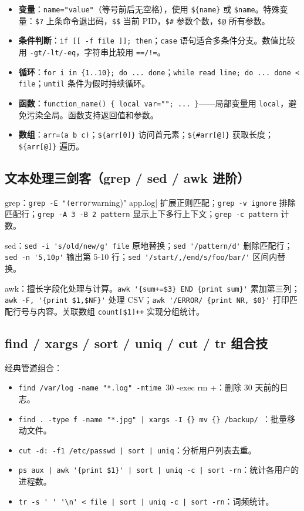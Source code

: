\documentclass[12pt,UTF8]{ctexbook}
\begin{document}
\begin{itemize}
	\item \textbf{变量}：\verb|name="value"|（等号前后无空格），使用 \verb|${name}| 或 \verb|$name|。特殊变量：\verb|$?| 上条命令退出码，\verb|$$| 当前 PID，\verb|$#| 参数个数，\verb|$@| 所有参数。
	\item \textbf{条件判断}：\verb|if [[ -f file ]]; then|；\verb|case| 语句适合多条件分支。数值比较用 \verb|-gt/-lt/-eq|，字符串比较用 \verb|==/!=|。
	\item \textbf{循环}：\verb|for i in {1..10}; do ... done|；\verb|while read line; do ... done < file|；\verb|until| 条件为假时持续循环。
	\item \textbf{函数}：\verb|function_name() { local var=""; ... }|——局部变量用 \verb|local|，避免污染全局。函数支持返回值和参数。
	\item \textbf{数组}：\verb|arr=(a b c)|；\verb|${arr[0]}| 访问首元素；\verb|${#arr[@]}| 获取长度；\verb|${arr[@]}| 遍历。
\end{itemize}

    \subsection{文本处理三剑客（grep / sed / awk 进阶）}

grep：\verb|grep -E "(error|warning)" app.log| 扩展正则匹配；\verb|grep -v ignore| 排除匹配行；\verb|grep -A 3 -B 2 pattern| 显示上下多行上下文；\verb|grep -c pattern| 计数。

sed：\verb|sed -i 's/old/new/g' file| 原地替换；\verb|sed '/pattern/d'| 删除匹配行；\verb|sed -n '5,10p'| 输出第 5-10 行；\verb|sed '/start/,/end/s/foo/bar/'| 区间内替换。

awk：擅长字段化处理与计算。\verb|awk '{sum+=$3} END {print sum}'| 累加第三列；\verb|awk -F, '{print $1,$NF}'| 处理 CSV；\verb|awk '/ERROR/ {print NR, $0}'| 打印匹配行号与内容。关联数组 \verb|count[$1]++| 实现分组统计。

    \subsection{find / xargs / sort / uniq / cut / tr 组合技}

经典管道组合：

\begin{itemize}
	\item \verb+find /var/log -name "*.log" -mtime +30 -exec rm {} \;+：删除 30 天前的日志。
	\item \verb+find . -type f -name "*.jpg" | xargs -I {} mv {} /backup/ +：批量移动文件。
	\item \verb+cut -d: -f1 /etc/passwd | sort | uniq+：分析用户列表去重。
	\item \verb+ps aux | awk '{print $1}' | sort | uniq -c | sort -rn+：统计各用户的进程数。
	\item \verb+tr -s ' ' '\n' < file | sort | uniq -c | sort -rn+：词频统计。
\end{itemize}
\end{document}
